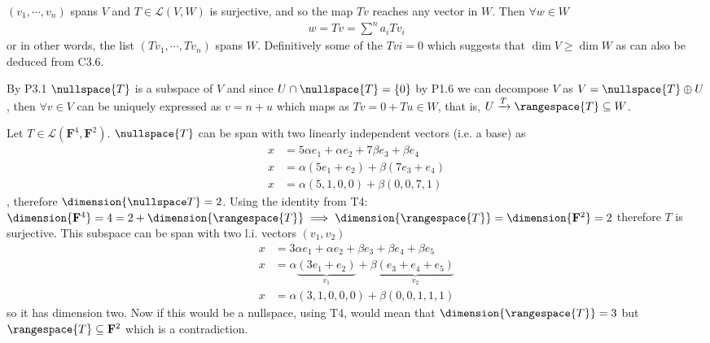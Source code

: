 \exo{} $(v_1,\cdots,v_n)$ spans $V$ and $T\in\mathcal{L}(V,W)$ is surjective, and 
so the map $Tv$ reaches any vector in $W$. Then $\forall w\in W$ 
\begin{align*}
  w = Tv = \sum^n a_i Tv_i
\end{align*}
or in other words, the list $(Tv_1,\cdots, Tv_n)$ spans $W$. Definitively some of the $Tvi=0$ which 
suggests that $\dim{V}\geq \dim{W}$ as can also be deduced from C3.6. 


\exo{} By P3.1 $\nullspace{T}$ is a subspace of $V$ and since $U \cap \nullspace{T} = \{0\}$ by P1.6 
we can decompose $V$ as $V = \nullspace{T} \oplus U$, then $\forall v\in V$ can be uniquely expressed as 
$v=n+u$ which maps as $Tv=0+Tu \in W$, that is, $U \xrightarrow{T} \rangespace{T} \subseteq W$.

\exo{} Let  $T\in\mathcal{L}(\mathbf{F}^4, \mathbf{F}^2)$. $\nullspace{T}$ can be span with two linearly independent
vectors (i.e. a base) as
\begin{align*}
  x &= 5\alpha e_1 + \alpha e_2 + 7\beta e_3+ \beta e_4 \\
  x &= \alpha (5e_1 + e_2) + \beta (7e_3 + e_4) \\
  x &= \alpha (5,1,0,0) + \beta (0,0,7,1)
\end{align*}
, therefore $\dimension{\nullspace T} = 2$. 
Using the identity from T4: $\dimension{\mathbf{F}^4} = 4 = 2 + \dimension{\rangespace{T}} \implies \dimension{\rangespace{T}} = \dimension{\mathbf{F}^2} = 2$ 
therefore $T$ is surjective. 
\exo{} This subspace can be span with two l.i. vectors $(v_1, v_2)$
\begin{align*}
  x &= 3\alpha e_1 + \alpha e_2 + \beta e_3+ \beta e_4 + \beta e_5\\
  x &= \alpha \underbrace{(3e_1 + e_2)}_{v_1} + \beta \underbrace{(e_3 + e_4 + e_5)}_{v_2} \\
  x &= \alpha (3,1,0,0,0) + \beta (0, 0, 1,1,1)
\end{align*}
so it has dimension two. Now if this would be a nullspace, using T4, would mean that $\dimension{\rangespace{T}} = 3$
but  $\rangespace{T} \subseteq \mathbf{F}^2$ which is a contradiction.

